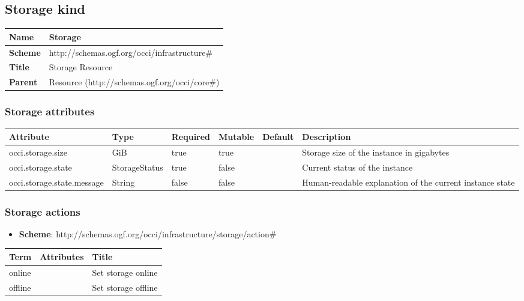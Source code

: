 \documentclass{article}
\begin{document}
\subsection{Storage kind}
\begin{center}
\begin{tabular}{|l|l|}
  \hline
  \textbf{Name} & Storage \\
  \hline  
  \textbf{Scheme} & http://schemas.ogf.org/occi/infrastructure\# \\
  \hline
  \textbf{Title} & Storage Resource \\
  \hline
  \textbf{Parent} & Resource (http://schemas.ogf.org/occi/core\#) \\
  \hline
\end{tabular}
\end{center}
\subsubsection{Storage attributes}
\begin{tabularx}{\textwidth}{|l|l|p{1.4cm}|p{1.3cm}|l|X|}
  \hline
  \textbf{Attribute} & \textbf{Type} & \textbf{Required} & \textbf{Mutable} & \textbf{Default} & \textbf{Description} \\
  \hline  
  occi.storage.size & GiB & true & true &  & Storage size of the instance in gigabytes \\
  \hline
  occi.storage.state & StorageStatus & true & false &  & Current status of the instance \\
  \hline
  occi.storage.state.message & String & false & false &  & Human-readable explanation of the current instance state \\
  \hline
\end{tabularx}

\subsubsection{Storage actions}
\begin{itemize}
	\item \textbf{Scheme}: http://schemas.ogf.org/occi/infrastructure/storage/action\#
\end{itemize}
\begin{tabularx}{\textwidth}{|l|l|X|}
  \hline
  \textbf{Term}  & \textbf{Attributes} & \textbf{Title} \\
  \hline  
  online & & Set storage online \\
  \hline
  offline & & Set storage offline \\
  \hline
\end{tabularx}
\end{document}
